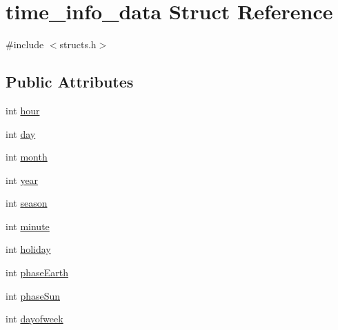 \hypertarget{structtime__info__data}{\section{time\-\_\-info\-\_\-data Struct Reference}
\label{structtime__info__data}
}


{\ttfamily \#include $<$structs.\-h$>$}

\subsection*{Public Attributes}
\begin{DoxyCompactItemize}
\item 
int \hyperlink{structtime__info__data_a0fcbcda81b3ab0a49d32a41744b137d9}{hour}
\item 
int \hyperlink{structtime__info__data_a1f01632ffda7d65eac96af317c583314}{day}
\item 
int \hyperlink{structtime__info__data_a22108b21961f4f9cec8b54a4b4c4d84d}{month}
\item 
int \hyperlink{structtime__info__data_a9b23c77bd71d154d663750877835b09a}{year}
\item 
int \hyperlink{structtime__info__data_ac33501726de03bc8755d9c478703fe45}{season}
\item 
int \hyperlink{structtime__info__data_a75276c6362e781fd5aa91b633a6b8213}{minute}
\item 
int \hyperlink{structtime__info__data_a95146b927318947189e5b300e1e06ef2}{holiday}
\item 
int \hyperlink{structtime__info__data_a9e6037ad4b7b0653cad792c1118b79fb}{phase\-Earth}
\item 
int \hyperlink{structtime__info__data_aa37cbf721a84db88ea4f3483395360fa}{phase\-Sun}
\item 
int \hyperlink{structtime__info__data_a25eb1efed1e6fa7b81bca031a9d747cd}{dayofweek}
\end{DoxyCompactItemize}


